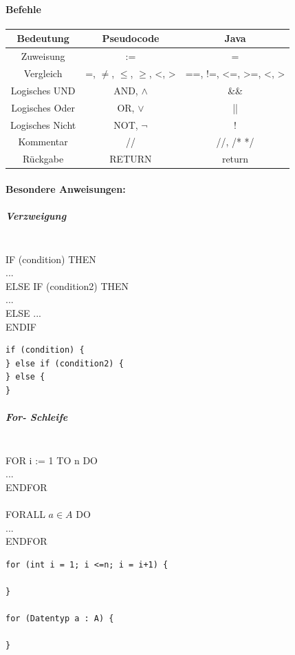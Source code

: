 \documentclass[fleqn]{scrartcl}
\begin{document}
\paragraph*{Befehle}
\begin{tabular}{c c c}

Bedeutung & Pseudocode & Java\\
\hline
Zuweisung & := & = \\
Vergleich & =, $\neq$, $\leq$, $\geq$, <, > & ==, !=, <=, >=, <, >\\
Logisches UND & AND, $\land$ & \&\&\\
Logisches Oder & OR, $\lor$ & || \\
Logisches Nicht & NOT, $\neg$ & ! \\
Kommentar & // & //, /* */ \\
Rückgabe & RETURN & return\\
\end{tabular}

\paragraph*{Besondere Anweisungen:}
\subparagraph{Verzweigung} $ $\\
IF (condition) THEN\\
\hspace*{2em} ...\\
ELSE IF (condition2) THEN\\
\hspace*{2em} ...\\
ELSE
\hspace*{2em} ...\\
ENDIF

 \begin{lstlisting}
if (condition) {
} else if (condition2) {
} else {
}
\end{lstlisting}

\subparagraph{For- Schleife} $ $\\
FOR i := 1 TO n DO\\
\hspace*{2em} ... \\
ENDFOR \\\\
FORALL $a \in A$ DO \\
\hspace*{2em} ... \\
ENDFOR

\begin{lstlisting}
for (int i = 1; i <=n; i = i+1) {

}

for (Datentyp a : A) {

}
\end{lstlisting}
\end{document}
